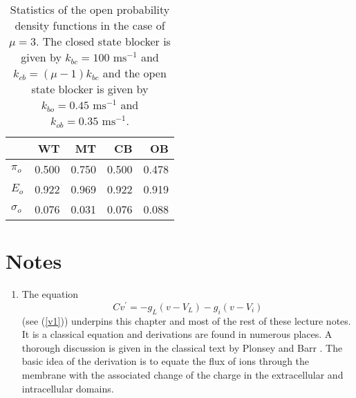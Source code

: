 \begin{table}  \begin{center}
\begin{tabular}{|l|r|r|r|r|} \hline
&WT & MT & CB & OB \\ \hline
$\pi_o$ &0.500 & 0.750 & 0.500 & 0.478 \\ \hline
$E_o$   &0.922 & 0.969 & 0.922 & 0.919 \\ \hline
$\sigma_o$ & 0.076 & 0.031 & 0.076 & 0.088 \\ \hline
\end{tabular} \end{center}
\caption{Statistics of the open probability density functions in the case of $\mu=3$. The closed state blocker is given by
$k_{bc}=100\text{ ms}^{-1}$ and $k_{cb}=\left(  \mu-1\right)  k_{bc}$ and the open state blocker is given by $k_{bo}=0.45\text{ ms}^{-1}$ and $k_{ob}=0.35\text{ ms}^{-1}$.  \label{Vstat}}
\end{table}




\section{Notes}

\begin{enumerate}
\item
The equation
\begin{equation}
Cv^{\prime}=-g_{L}\left(  v-V_{L}\right)  -g_{i}(v-V_{i}) 
\end{equation}
(see (\ref{v1})) underpins this chapter and most of the rest of these lecture notes. It is a classical equation
and derivations are found in numerous places. A thorough discussion is given in the classical text by Plonsey and Barr \cite{Plonsey2007}.
The basic idea of the derivation is to equate the flux of ions through the membrane with the associated change of the charge in the extracellular
and intracellular domains.
\end{enumerate}



